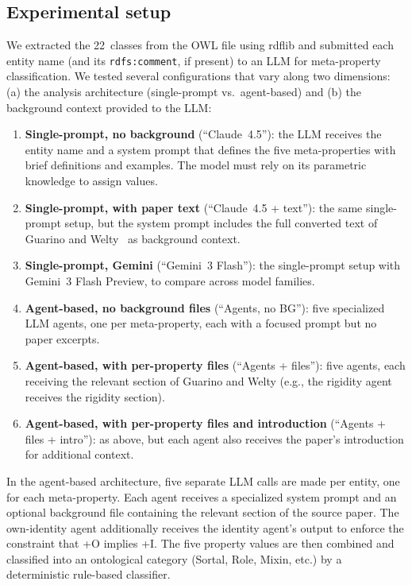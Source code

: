 \documentclass{IOS-Book-Article}
\begin{document}
\subsection{Experimental setup}

We extracted the 22~classes from the OWL file using rdflib and
submitted each entity name (and its \texttt{rdfs:comment}, if present)
to an LLM for meta-property classification.  We tested several
configurations that vary along two dimensions: (a) the analysis
architecture (single-prompt vs.\ agent-based) and (b) the background
context provided to the LLM:

\begin{enumerate}
\item \textbf{Single-prompt, no background} (``Claude~4.5''): the LLM
  receives the entity name and a system prompt that defines the five
  meta-properties with brief definitions and examples.  The model must
  rely on its parametric knowledge to assign values.
\item \textbf{Single-prompt, with paper text} (``Claude~4.5 +
  text''): the same single-prompt setup, but the system prompt
  includes the full converted text of Guarino and
  Welty~\cite{guarino2000formal} as background context.
\item \textbf{Single-prompt, Gemini} (``Gemini~3 Flash''): the
  single-prompt setup with Gemini~3 Flash Preview, to compare across
  model families.
\item \textbf{Agent-based, no background files} (``Agents, no BG''):
  five specialized LLM agents, one per meta-property, each with a
  focused prompt but no paper excerpts.
\item \textbf{Agent-based, with per-property files} (``Agents +
  files''): five agents, each receiving the relevant section of
  Guarino and Welty (e.g., the rigidity agent receives the rigidity
  section).
\item \textbf{Agent-based, with per-property files and introduction}
  (``Agents + files + intro''): as above, but each agent also receives
  the paper's introduction for additional context.
\end{enumerate}

In the agent-based architecture, five separate LLM calls are made per
entity, one for each meta-property.  Each agent receives a specialized
system prompt and an optional background file containing the relevant
section of the source paper.  The own-identity agent additionally
receives the identity agent's output to enforce the constraint that
+O implies +I.  The five property values are then combined and
classified into an ontological category (Sortal, Role, Mixin, etc.)
by a deterministic rule-based classifier.
\end{document}
